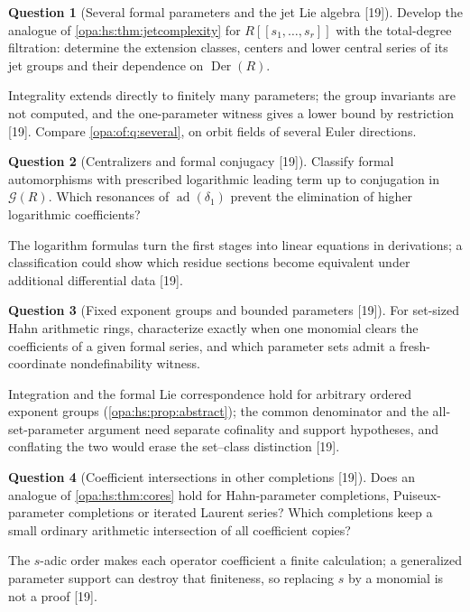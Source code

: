 \documentclass[11pt,oneside]{article}
\numberwithin{equation}{section}
\theoremstyle{definition}
\newtheorem{question}[question]{Question}
\theoremstyle{remark}
\newcommand{\ad}{\operatorname{ad}}
\newcommand{\src}[1]{\textup{\textsf{\small[#1]}}}
\newcommand{\Der}{\operatorname{Der}}
\begin{document}
\begin{question}[Several formal parameters and the jet Lie algebra \src{19}]\label{opa:hs:q:several}
Develop the analogue of \cref{opa:hs:thm:jetcomplexity} for $R[[s_1,\dots,s_r]]$ with the total-degree filtration: determine the extension classes, centers and
lower central series of its jet groups and their dependence on $\Der(R)$.
\end{question}
Integrality extends directly to finitely many parameters; the group invariants are not computed, and the one-parameter witness gives a lower bound by
restriction \src{19}. Compare \cref{opa:of:q:several}, on orbit fields of several Euler directions.

\begin{question}[Centralizers and formal conjugacy \src{19}]\label{opa:hs:q:conjugacy}
Classify formal automorphisms with prescribed logarithmic leading term up to conjugation in $\mathcal G(R)$. Which resonances of $\ad(\delta_1)$ prevent the
elimination of higher logarithmic coefficients?
\end{question}
The logarithm formulas turn the first stages into linear equations in derivations; a classification could show which residue sections become equivalent
under additional differential data \src{19}.

\begin{question}[Fixed exponent groups and bounded parameters \src{19}]\label{opa:hs:q:setsized}
For set-sized Hahn arithmetic rings, characterize exactly when one monomial clears the coefficients of a given formal series, and which parameter sets
admit a fresh-coordinate nondefinability witness.
\end{question}
Integration and the formal Lie correspondence hold for arbitrary ordered exponent groups (\cref{opa:hs:prop:abstract}); the common denominator and the
all-set-parameter argument need separate cofinality and support hypotheses, and conflating the two would erase the set--class distinction \src{19}.

\begin{question}[Coefficient intersections in other completions \src{19}]\label{opa:hs:q:completions}
Does an analogue of \cref{opa:hs:thm:cores} hold for Hahn-parameter completions, Puiseux-parameter completions or iterated Laurent series? Which completions
keep a small ordinary arithmetic intersection of all coefficient copies?
\end{question}
The $s$-adic order makes each operator coefficient a finite calculation; a generalized parameter support can destroy that finiteness, so replacing $s$ by
a monomial is not a proof \src{19}.
\end{document}
